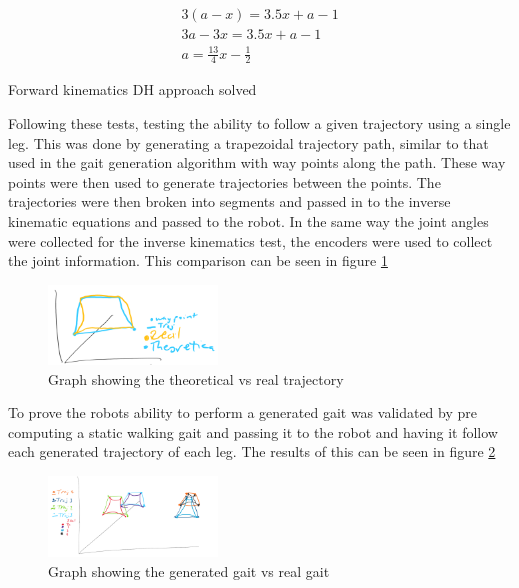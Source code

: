 \documentclass[conference]{IEEEtran}
\begin{document}
\begin{eqfloat}[H]
$$
        \begin{aligned}
            3(a-x) = 3.5x + a - 1           \\
            3a - 3x = 3.5x + a -1           \\
            a = \frac{13}{4}x - \frac{1}{2} 
        \end{aligned}
$$
\caption{\label{eq:testfkDH}Forward kinematics DH approach solved}
\end{eqfloat}

Following these tests, testing the ability to follow a given trajectory using a single leg. This was done by generating a trapezoidal trajectory path, similar to that used in the gait generation algorithm with way points along the path. These way points were then used to generate trajectories between the points. The trajectories were then broken into segments and passed in to the inverse kinematic equations and passed to the robot. In the same way the joint angles were collected for the inverse kinematics test, the encoders were used to collect the joint information. This comparison can be seen in figure \ref{fig:Trajectory}

    \begin{figure}[H]
	\centering
      \includegraphics[width=0.4\textwidth]{Images/trajectory.PNG}
  	\caption{Graph showing the theoretical vs real trajectory}
  	\label{fig:Trajectory}
\end{figure}

To prove the robots ability to perform a generated gait was validated by pre computing a static walking gait and passing it to the robot and having it follow each generated trajectory of each leg. The results of this can be seen in figure \ref{fig:gait}
    \begin{figure}[H]
	\centering
      \includegraphics[width=0.4\textwidth]{Images/gaits.PNG}
  	\caption{Graph showing the generated gait vs real gait}
  	\label{fig:gait}
\end{figure}
\end{document}

